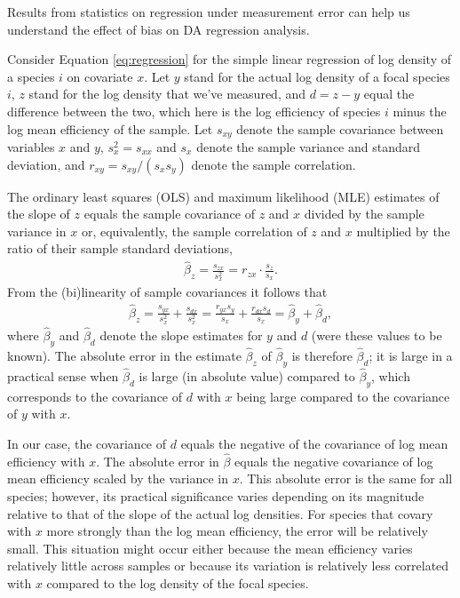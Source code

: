 \documentclass[
]{article}
\begin{document}
Results from statistics on regression under measurement error can help us understand the effect of bias on DA regression analysis.

Consider Equation \eqref{eq:regression} for the simple linear regression of log density of a species \(i\) on covariate \(x\).
Let \(y\) stand for the actual log density of a focal species \(i\), \(z\) stand for the log density that we've measured, and \(d = z - y\) equal the difference between the two, which here is the log efficiency of species \(i\) minus the log mean efficiency of the sample.
Let \(s_{xy}\) denote the sample covariance between variables \(x\) and \(y\), \(s^{2}_{x} = s_{xx}\) and \(s_{x}\) denote the sample variance and standard deviation, and \(r_{xy} = s_{xy}/(s_{x}s_{y})\) denote the sample correlation.

The ordinary least squares (OLS) and maximum likelihood (MLE) estimates of the slope of \(z\) equals the sample covariance of \(z\) and \(x\) divided by the sample variance in \(x\) or, equivalently, the sample correlation of \(z\) and \(x\) multiplied by the ratio of their sample standard deviations,
\begin{align}
  \hat \beta_z = \frac{s_{zx}}{s^2_x} = r_{zx} \cdot \frac{s_z}{s_x}.
\end{align}
From the (bi)linearity of sample covariances it follows that
\begin{align}
  \hat \beta_z 
  = \frac{s_{yx}}{s^2_x} + \frac{s_{dx}}{s^2_x} 
  = \frac{r_{yx} s_y}{s_x} + \frac{r_{dx} s_d}{s_x} 
  = \hat \beta_y + \hat \beta_d,
\end{align}
where \(\hat \beta_y\) and \(\hat \beta_d\) denote the slope estimates for \(y\) and \(d\) (were these values to be known).
The absolute error in the estimate \(\hat \beta_{z}\) of \(\hat \beta_{y}\) is therefore \(\hat \beta_{d}\); it is large in a practical sense when \(\hat \beta_{d}\) is large (in absolute value) compared to \(\hat \beta_{y}\), which corresponds to the covariance of \(d\) with \(x\) being large compared to the covariance of \(y\) with \(x\).

In our case, the covariance of \(d\) equals the negative of the covariance of log mean efficiency with \(x\).
The absolute error in \(\hat \beta\) equals the negative covariance of log mean efficiency scaled by the variance in \(x\).
This absolute error is the same for all species; however, its practical significance varies depending on its magnitude relative to that of the slope of the actual log densities.
For species that covary with \(x\) more strongly than the log mean efficiency, the error will be relatively small.
This situation might occur either because the mean efficiency varies relatively little across samples or because its variation is relatively less correlated with \(x\) compared to the log density of the focal species.
\end{document}
